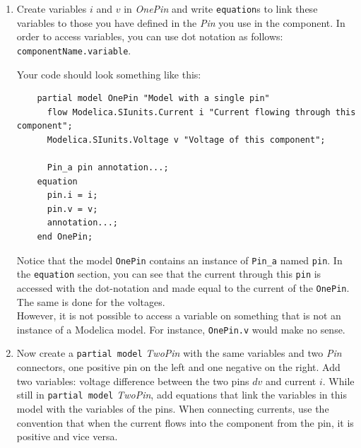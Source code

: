 \documentclass[10pt,a4paper]{article}
\begin{document}
\begin{enumerate}
	\item Create variables $i$ and $v$ in \textit{OnePin} and write 
	\texttt{equation}s to link these variables to those you have defined in the 
	\textit{Pin} you use in the component. In order to access variables, you 
	can use dot notation as follows: \texttt{componentName.variable}.
	
	Your code should look something like this:
	\begin{lstlisting}
	partial model OnePin "Model with a single pin"
	  flow Modelica.SIunits.Current i "Current flowing through this component";
	  Modelica.SIunits.Voltage v "Voltage of this component";
	
	  Pin_a pin annotation...;
	equation
	  pin.i = i;
	  pin.v = v;
	  annotation...;
	end OnePin;
	\end{lstlisting}
	
	Notice that the model \texttt{OnePin} contains an instance of 
	\texttt{Pin\_a} named \texttt{pin}. In the \texttt{equation} section, you 
	can see that the current through this \texttt{pin} is accessed with the 
	dot-notation and made equal to the current of the \texttt{OnePin}. The same 
	is done for the voltages. \\
	However, it is not possible to access a variable on something that is not 
	an instance of a Modelica model. For instance, \texttt{OnePin.v} would make 
	no sense.
	
	\item Now create a \texttt{partial model} \textit{TwoPin} with the same 
	variables and two \textit{Pin} connectors, one positive pin on the left and 
	one negative on the right. Add two variables: voltage difference between 
	the two pins $dv$ and current $i$. 
	While still in \texttt{partial model} \textit{TwoPin}, add equations that link the variables in this model with the variables of the pins. When connecting currents, use the convention that when the current flows into the component from the pin, it is positive and vice versa.
	

\end{enumerate}
\end{document}
